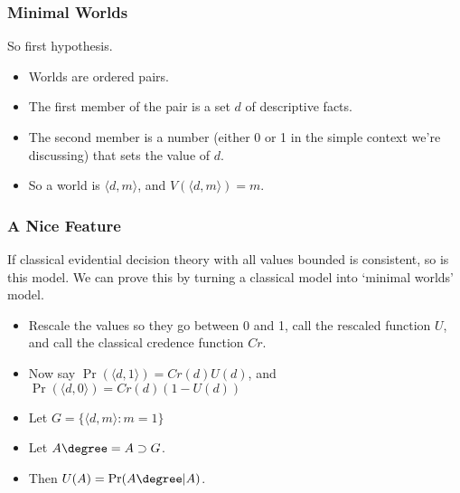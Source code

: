 \begin{frame}[fragile]
\frametitle{Minimal Worlds}
\label{minimalworlds}

So first hypothesis.

\begin{itemize}
\item{} Worlds are ordered pairs.

\item{} The first member of the pair is a set $d$ of descriptive facts.

\item{} The second member is a number (either 0 or 1 in the simple context we're discussing) that sets the value of $d$.

\item{} So a world is $\langle d, m \rangle$, and $V(\langle d, m \rangle) = m$.

\end{itemize}

\end{frame}

\begin{frame}[fragile]
\frametitle{A Nice Feature}
\label{anicefeature}

If classical evidential decision theory with all values bounded is consistent, so is this model. We can prove this by turning a classical model into `minimal worlds' model.

\begin{itemize}
\item{} Rescale the values so they go between 0 and 1, call the rescaled function $U$, and call the classical credence function $Cr$.

\item{} Now say $\Pr(\langle d, 1\rangle) = Cr(d)U(d)$, and $\Pr(\langle d, 0\rangle) = Cr(d)(1-U(d))$

\item{} Let $G = \{\langle d, m\rangle: m = 1\}$

\item{} Let $A\degree = A \supset G$.

\item{} Then $U(A) = \Pr(A\degree | A)$.

\end{itemize}

\end{frame}

